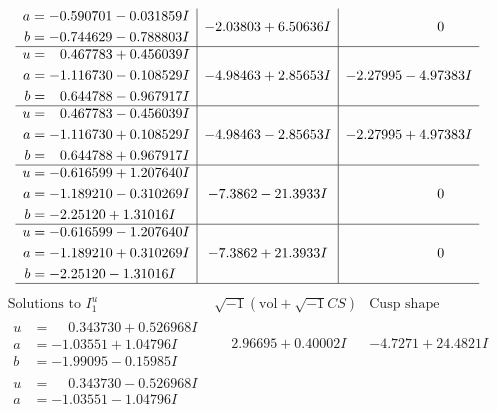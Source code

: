 \documentclass[1p]{elsarticle_modified}
\theoremstyle{definition}
\newcommand{\I}{\sqrt{-1}}
\begin{document}
$$\begin{array}{c|c|c}
\begin{aligned}
a &= -0.590701 - 0.031859 I \\
b &= -0.744629 - 0.788803 I\end{aligned}
 & -2.03803 + 6.50636 I & \phantom{-0.000000 } 0 \\ \hline\begin{aligned}
u &= \phantom{-}0.467783 + 0.456039 I \\
a &= -1.116730 - 0.108529 I \\
b &= \phantom{-}0.644788 - 0.967917 I\end{aligned}
 & -4.98463 + 2.85653 I & -2.27995 - 4.97383 I \\ \hline\begin{aligned}
u &= \phantom{-}0.467783 - 0.456039 I \\
a &= -1.116730 + 0.108529 I \\
b &= \phantom{-}0.644788 + 0.967917 I\end{aligned}
 & -4.98463 - 2.85653 I & -2.27995 + 4.97383 I \\ \hline\begin{aligned}
u &= -0.616599 + 1.207640 I \\
a &= -1.189210 - 0.310269 I \\
b &= -2.25120 + 1.31016 I\end{aligned}
 & -7.3862 - 21.3933 I & \phantom{-0.000000 } 0 \\ \hline\begin{aligned}
u &= -0.616599 - 1.207640 I \\
a &= -1.189210 + 0.310269 I \\
b &= -2.25120 - 1.31016 I\end{aligned}
 & -7.3862 + 21.3933 I & \phantom{-0.000000 } 0\\
 \hline 
 \end{array}$$\newpage$$\begin{array}{c|c|c}  
\text{Solutions to }I^u_{1}& \I (\text{vol} + \sqrt{-1}CS) & \text{Cusp shape}\\
 \hline 
\begin{aligned}
u &= \phantom{-}0.343730 + 0.526968 I \\
a &= -1.03551 + 1.04796 I \\
b &= -1.99095 - 0.15985 I\end{aligned}
 & \phantom{-}2.96695 + 0.40002 I & -4.7271 + 24.4821 I \\ \hline\begin{aligned}
u &= \phantom{-}0.343730 - 0.526968 I \\
a &= -1.03551 - 1.04796 I \\

\end{aligned}
\end{array}$$
\end{document}
